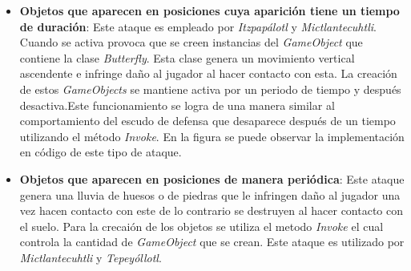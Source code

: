 \begin{itemize}
		\item \textbf{Objetos que aparecen en posiciones cuya aparición tiene un tiempo 
		de duración}: Este ataque es empleado por \textit{Itzpapálotl} y 
		\textit{Mictlantecuhtli}. Cuando se activa provoca que se creen instancias del 
		\textit{GameObject} que contiene la clase \textit{Butterfly}. Esta clase genera 
		un movimiento vertical ascendente e infringe daño al jugador al hacer contacto 
		con esta. La creación de estos \textit{GameObjects} se mantiene activa por un 
		periodo de tiempo y después desactiva.Este funcionamiento se logra de una 
		manera similar al comportamiento del escudo de defensa que desaparece después 
		de un tiempo utilizando el método \textit{Invoke}. En la figura se puede 
		observar la implementación en código de este tipo de ataque.  

		\item \textbf{Objetos que aparecen en posiciones de manera periódica}: Este 
		ataque genera una lluvia de huesos o de piedras que le infringen daño al 
		jugador una vez hacen contacto con este de lo contrario se destruyen al hacer 
		contacto con el suelo. Para la crecaión de los objetos se utiliza el metodo 
		\textit{Invoke} el cual controla la cantidad de \textit{GameObject} que se 
		crean. Este ataque es utilizado por \textit{Mictlantecuhtli} y 
		\textit{Tepeyóllotl}.
	\end{itemize}
 
